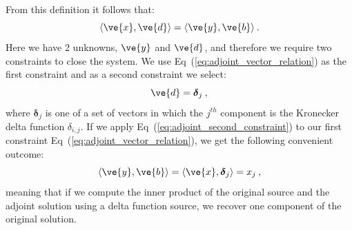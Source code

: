\documentclass[preprint,11pt]{elsarticle}
\begin{document}
From this definition it follows that:
\begin{equation}
  \langle \ve{x}, \ve{d} \rangle = \langle \ve{y}, \ve{b} \rangle\:.
  \label{eq:adjoint_vector_relation}
\end{equation}
Here we have 2 unknowns, $\ve{y}$ and $\ve{d}$, and therefore we
require two constraints to close the system. We use
Eq~(\ref{eq:adjoint_vector_relation}) as the first constraint and as a
second constraint we select:
\begin{equation}
  \ve{d} = \boldsymbol{\delta}_j\:,
  \label{eq:adjoint_second_constraint}
\end{equation}
where $\boldsymbol{\delta}_j$ is one of a set of vectors in which the
$j^{th}$ component is the Kronecker delta function $\delta_{i,j}$. If
we apply Eq~(\ref{eq:adjoint_second_constraint}) to our first
constraint Eq~(\ref{eq:adjoint_vector_relation}), we get the following
convenient outcome:
\begin{equation}
  \langle \ve{y}, \ve{b} \rangle = \langle \ve{x},
  \boldsymbol{\delta}_j \rangle = x_j \:,
  \label{eq:inner_product_constraint}
\end{equation}
meaning that if we compute the inner product of the original source
and the adjoint solution using a delta function source, we recover one
component of the original solution.
\end{document}
